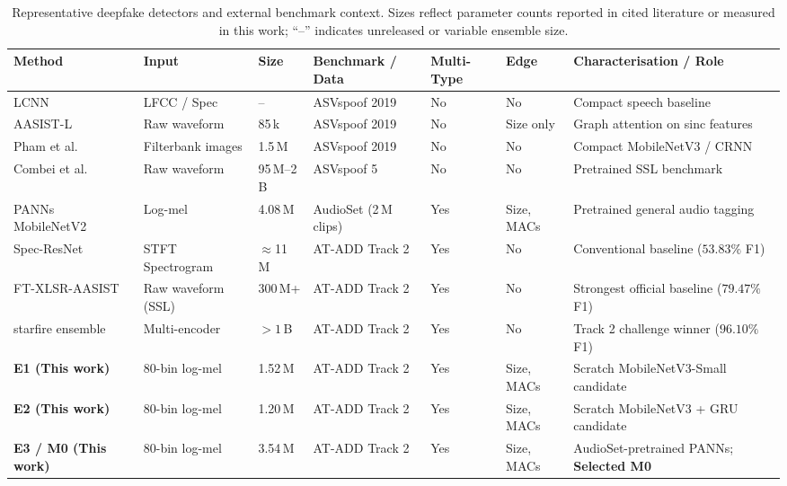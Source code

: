 \documentclass[12pt,a4paper]{report}
\begin{document}
\begin{table}[htbp]
\centering
\caption{Representative deepfake detectors and external benchmark context. Sizes reflect parameter counts reported in cited literature or measured in this work; ``--'' indicates unreleased or variable ensemble size.}
\label{tab:related}
\small
\setlength{\tabcolsep}{3.5pt}

\begin{tabular}{@{}p{2.6cm}p{2.3cm}p{1.8cm}p{2.6cm}p{1.8cm}p{1.5cm}p{2.8cm}@{}}
\toprule
Method & Input & Size & Benchmark / Data & Multi-Type & Edge & Characterisation / Role \\
\midrule
LCNN~\cite{lavrentyeva2019stc} & LFCC / Spec & -- & ASVspoof 2019 & No & No & Compact speech baseline \\
AASIST-L~\cite{jung2022aasist} & Raw waveform & 85\,k & ASVspoof 2019 & No & Size only & Graph attention on sinc features \\
Pham et al.~\cite{pham2024deepfake} & Filterbank images & 1.5\,M & ASVspoof 2019 & No & No & Compact MobileNetV3 / CRNN \\
Combei et al.~\cite{combei2024wavlm} & Raw waveform & 95\,M--2\,B & ASVspoof 5 & No & No & Pretrained SSL benchmark \\
PANNs MobileNetV2~\cite{kong2020panns} & Log-mel & 4.08\,M & AudioSet (2\,M clips) & Yes & Size, MACs & Pretrained general audio tagging \\
\midrule
Spec-ResNet~\cite{xie2026atadd} & STFT Spectrogram & $\approx$11\,M & AT-ADD Track 2 & Yes & No & Conventional baseline ($53.83\%$ F1) \\
FT-XLSR-AASIST~\cite{xie2026atadd} & Raw waveform (SSL) & 300\,M+ & AT-ADD Track 2 & Yes & No & Strongest official baseline ($79.47\%$ F1) \\
starfire ensemble~\cite{xie2026atadd} & Multi-encoder & $>1$\,B & AT-ADD Track 2 & Yes & No & Track 2 challenge winner ($96.10\%$ F1) \\
\midrule
\textbf{E1 (This work)} & 80-bin log-mel & 1.52\,M & AT-ADD Track 2 & Yes & Size, MACs & Scratch MobileNetV3-Small candidate \\
\textbf{E2 (This work)} & 80-bin log-mel & 1.20\,M & AT-ADD Track 2 & Yes & Size, MACs & Scratch MobileNetV3 + GRU candidate \\
\textbf{E3 / M0 (This work)} & 80-bin log-mel & 3.54\,M & AT-ADD Track 2 & Yes & Size, MACs & AudioSet-pretrained PANNs; \textbf{Selected M0} \\
\bottomrule
\end{tabular}

\end{table}
\end{document}
